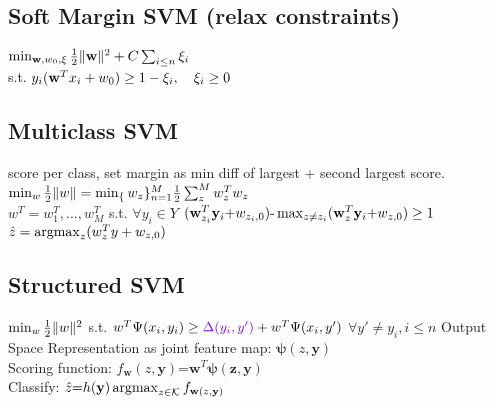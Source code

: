 \subsection*{Soft Margin SVM (relax constraints)}
$\min_{\mathbf w, w_0, \xi} \frac{1}{2}\|\mathbf w\|^2 + C\sum_{i\leq n}\xi_i$\\
s.t. $ y_i(\mathbf w^Tx_i + w_0) \geq 1 - \xi_i, \quad \xi_i \geq 0$







\subsection*{Multiclass SVM}
score per class, set margin as min diff of largest + second largest score.
$\min_w\frac{1}{2}\|w\| = \min_\{w_z\}_{n=1}^M \frac{1}{2}\sum_z^M w_z^Tw_z$ \\
$w^T = w_1^T, ..., w_M^T$ s.t. $\forall y_i\in Y$
$(\mathbf{w}_{z_i}^T\mathbf{y}_i\text{+}w_{z_i,0})\text{-}\max_{z\not\text{=}z_i}(\mathbf{w}_z^T\mathbf{y}_i\text{+}w_{z,0})\geq 1$ \\
$\hat z = \mathop{\mathrm{argmax}}_z(w_z^Ty + w_{z,0})$



\subsection*{Structured SVM}
$\min_w \frac{1}{2} \|w\|^2$ 
		s.t. $w^T\Psi(x_i, y_i) \geq {\color{imp}\Delta(y_i, y')} + w^T\Psi(x_i, y')$
		$\forall y'\neq y_i, i\leq n$
		\sepline
Output Space Representation as joint feature map: $\mathbf{\psi}(z,\mathbf{y})$\\
Scoring function: $f_{\mathbf{w}}(z,\mathbf{y})\text{=}\mathbf{w}^T\mathbf{\psi(z, \mathbf{y})}$\\
Classify: $\hat{z}\text{=}h(\mathbf{y})\mathop{\mathrm{argmax}}_{z\in\mathcal{K}}f_{\mathbf{w}(z, \mathbf{y})}$